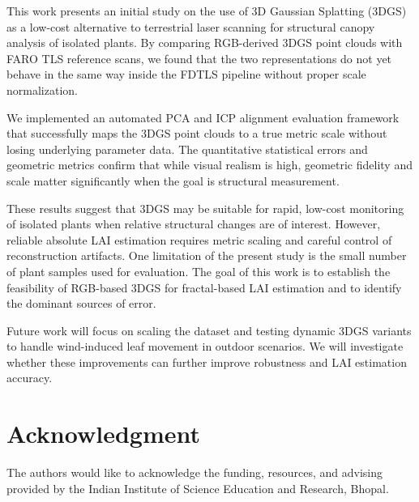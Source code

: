\documentclass[10pt,twocolumn,letterpaper]{article}
\begin{document}
This work presents an initial study on the use of 3D Gaussian Splatting (3DGS) as a low-cost alternative to terrestrial laser scanning for structural canopy analysis of isolated plants. By comparing RGB-derived 3DGS point clouds with FARO TLS reference scans, we found that the two representations do not yet behave in the same way inside the FDTLS pipeline without proper scale normalization. 

We implemented an automated PCA and ICP alignment evaluation framework that successfully maps the 3DGS point clouds to a true metric scale without losing underlying parameter data. The quantitative statistical errors and geometric metrics confirm that while visual realism is high, geometric fidelity and scale matter significantly when the goal is structural measurement. 

These results suggest that 3DGS may be suitable for rapid, low-cost monitoring of isolated plants when relative structural changes are of interest. However, reliable absolute LAI estimation requires metric scaling and careful control of reconstruction artifacts. One limitation of the present study is the small number of plant samples used for evaluation. The goal of this work is to establish the feasibility of RGB-based 3DGS for fractal-based LAI estimation and to identify the dominant sources of error.

Future work will focus on scaling the dataset and testing dynamic 3DGS variants to handle wind-induced leaf movement in outdoor scenarios. We will investigate whether these improvements can further improve robustness and LAI estimation accuracy.


\section*{Acknowledgment}
The authors would like to acknowledge the funding, resources, and advising provided by the Indian Institute of Science Education and Research, Bhopal.

{
    \small
    
    
}
\end{document}
